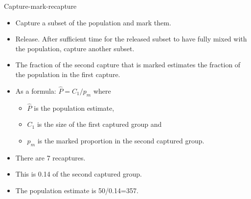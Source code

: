 \documentclass[
  ignorenonframetext,
]{beamer}
\newenvironment{Shaded}{\begin{snugshade}}{\end{snugshade}}
\newcommand{\DecValTok}[1]{\textcolor[rgb]{0.00,0.00,0.81}{#1}}
\newcommand{\KeywordTok}[1]{\textcolor[rgb]{0.13,0.29,0.53}{\textbf{#1}}}
\newcommand{\NormalTok}[1]{#1}
\newcommand{\OperatorTok}[1]{\textcolor[rgb]{0.81,0.36,0.00}{\textbf{#1}}}
\newcommand{\StringTok}[1]{\textcolor[rgb]{0.31,0.60,0.02}{#1}}
\providecommand{\tightlist}{%
  \setlength{\itemsep}{0pt}\setlength{\parskip}{0pt}}
\begin{document}
\begin{frame}[fragile]{Capture-mark-recapture}
\protect\hypertarget{capture-mark-recapture}{}

\begin{itemize}
\tightlist
\item
  Capture a subset of the population and mark them.
\item
  Release. After sufficient time for the released subset to have fully
  mixed with the population, capture another subset.
\item
  The fraction of the second capture that is marked estimates the
  fraction of the population in the first capture.
\item
  As a formula: \(\hat P = C_1/p_m\) where

  \begin{itemize}
  \tightlist
  \item
    \(\hat P\) is the population estimate,
  \item
    \(C_1\) is the size of the first captured group and
  \item
    \(p_m\) is the marked proportion in the second captured group.
  \end{itemize}
\end{itemize}

\scriptsize

\begin{Shaded}
\end{Shaded}

\normalsize

\begin{itemize}
\tightlist
\item
  There are 7 recaptures.
\item
  This is 0.14 of the second captured group.
\item
  The population estimate is 50/0.14=357.
\end{itemize}

\end{frame}
\end{document}
